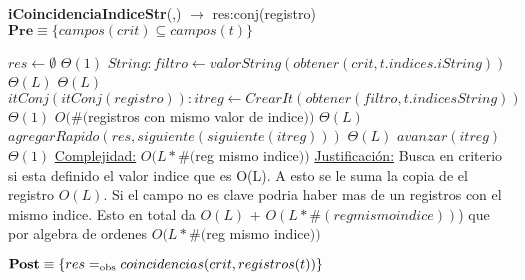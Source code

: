 \begin{algorithm}[H]{\textbf{iCoincidenciaIndiceStr}(,) $\to$ res:conj(registro)}
	{\\ $\textbf{Pre} \equiv \{campos(crit) \subseteq campos(t)\}$}
	\begin{algorithmic}[1]
		\State $res \gets \emptyset$ \Comment $\Theta(1)$
		\State $String: filtro \gets valorString(obtener(crit,t.indices.iString))$ \Comment $\Theta(L)$
		 \Comment $\Theta(L)$
			\State $itConj(itConj(registro)): itreg \gets CrearIt(obtener(filtro,t.indicesString))$ \Comment	$\Theta(1)$
			 \Comment $O(\#($registros con mismo valor de indice$))$
					\Comment $\Theta(L)$
					\State $agregarRapido(res,siguiente(siguiente(itreg)))$	\Comment $\Theta(L)$
				\EndIf
				\State $avanzar(itreg)$	\Comment $\Theta(1)$
			\EndWhile
		\EndIf
		\medskip
		\Statex \underline{Complejidad:} $O(L * \#($reg mismo indice$))$
		\Statex \underline{Justificación:} Busca en criterio si esta definido el valor indice que es O(L). A esto se le suma la copia de el registro $O(L)$. Si el campo no es clave podria haber mas de un registros con el mismo indice. Esto en total da $O(L)$ + $O(L*\#(reg mismo indice))$) que por algebra de ordenes $O(L * \#($reg mismo indice$))$
	\end{algorithmic}
	{$\textbf{Post} \equiv \{res =_{\mathrm{obs}} coincidencias(crit,registros(t))\}$}
\end{algorithm}